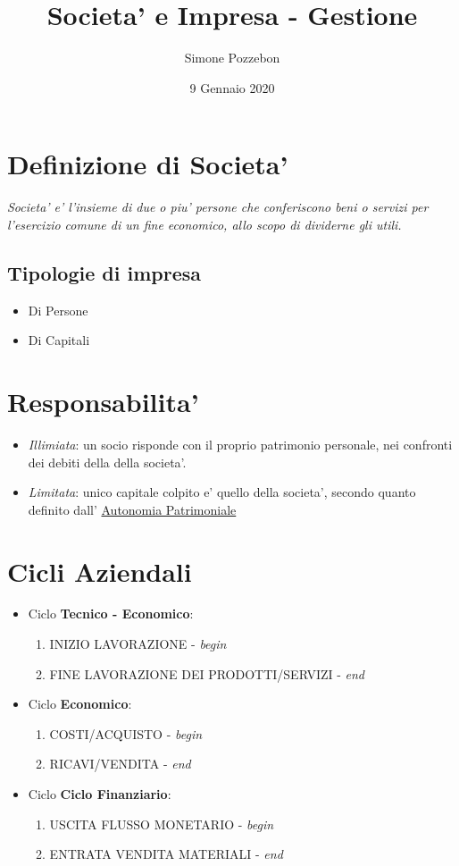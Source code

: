 \documentclass[a4paper,12pt]{report}
\title{Societa' e Impresa - Gestione}
\author{Simone Pozzebon}
\begin{document}
\maketitle
\tableofcontents
\newpage
\date{9 Gennaio 2020}
\section{Definizione di Societa'}
\textit{Societa' e' l'insieme di due o piu' persone che conferiscono beni o servizi per l'esercizio 
comune di un fine economico, allo scopo di dividerne gli utili.} \\
\subsection{Tipologie di impresa}
\begin{itemize}
    \item Di Persone
    \item Di Capitali
\end{itemize}

\section{Responsabilita'}
\begin{itemize}
    \item \textit{Illimiata}: un socio risponde con il proprio patrimonio personale, nei confronti dei debiti della
    della societa'.
    \item \textit{Limitata}: unico capitale colpito e' quello della societa', secondo quanto definito dall' \underline{Autonomia Patrimoniale}
\end{itemize}

\section{Cicli Aziendali}
\begin{itemize}
    \item Ciclo \textbf{Tecnico - Economico}: 
    \begin{enumerate}
        \item INIZIO LAVORAZIONE - \textit{begin} 
        \item FINE LAVORAZIONE DEI PRODOTTI/SERVIZI - \textit{end}
    \end{enumerate}
    \item Ciclo \textbf{Economico}:
    \begin{enumerate}
        \item COSTI/ACQUISTO - \textit{begin}
        \item RICAVI/VENDITA - \textit{end}
    \end{enumerate}
    \item Ciclo \textbf{Ciclo Finanziario}:
    \begin{enumerate}
        \item USCITA FLUSSO MONETARIO - \textit{begin}
        \item ENTRATA VENDITA MATERIALI - \textit{end}
    \end{enumerate}
\end{itemize}
\end{document}
